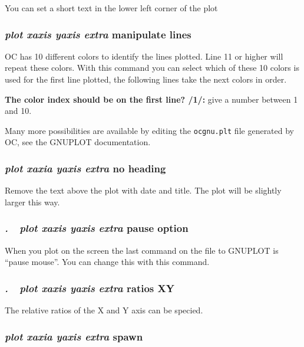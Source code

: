 \documentclass[11pt]{article}
\begin{document}
You can set a short text in the lower left corner of the plot

\hypertarget{Extra manipulate lines}{}
\hypertarget{Plot manipulate colors}{}
\subsubsection{{\em plot xaxis yaxis extra} manipulate lines}

OC has 10 different colors to identify the lines plotted.  Line 11 or
higher will repeat these colors.  With this command you can select
which of these 10 colors is used for the first line plotted, the
following lines take the next colors in order.

{\bf The color index should be on the first line? /1/:} give a number
between 1 and 10.

Many more possibilities are available by editing the {\tt ocgnu.plt}
file generated by OC, see the GNUPLOT documentation.

\hypertarget{Plot no heading}{}
\subsubsection{{\em plot xaxia yaxis extra} no heading}

Remove the text above the plot with date and title.  The plot will be
slightly larger this way.

\hypertarget{Plot pause}{}
\subsubsection{{\em .~~plot xaxis yaxis extra} pause option}

When you plot on the screen the last command on the file to GNUPLOT
is ``pause mouse''.  You can change this with this command.

\hypertarget{Plot ratios}{}
\subsubsection{{\em .~~plot xaxis yaxis extra} ratios XY}

The relative ratios of the X and Y axis can be specied.

\hypertarget{Plot spawn}{}
\subsubsection{{\em plot xaxia yaxis extra} spawn}
\end{document}
